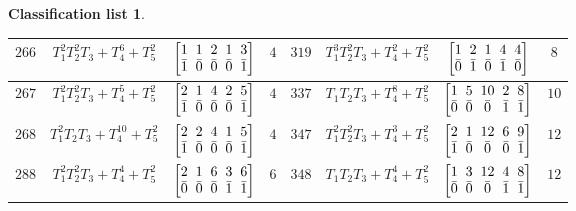 \documentclass[10pt,a4paper]{amsart}
\theoremstyle{definition}
\newtheorem{class-list}[thm]{Classification list}
\numberwithin{equation}{section}
\begin{document}
\begin{class-list}
\begin{table}[h!]
\begin{tabu}{c|c|c|c||c|c|c|c}
\\
\hline
${266}$&${T_{1}^{2}T_{2}^{2}T_{3}+T_{4}^{6}+T_{5}^{2}}$
&$\arraycolsep=1mm\begin{bmatrix}{1} & {1} & {2} & {1} & {3} \\ {\bar{1}} & {\bar{0}} & {\bar{0}} & {\bar{0}} & {\bar{1}}\end{bmatrix}$&${4}$
&${319}$&${T_{1}^{3}T_{2}^{2}T_{3}+T_{4}^{2}+T_{5}^{2}}$
&$\arraycolsep=1mm\begin{bmatrix}{1} & {2} & {1} & {4} & {4} \\ {\bar{0}} & {\bar{1}} & {\bar{0}} & {\bar{1}} & {\bar{0}}\end{bmatrix}$&${8}$
\\
\hline
${267}$&${T_{1}^{2}T_{2}^{2}T_{3}+T_{4}^{5}+T_{5}^{2}}$
&$\arraycolsep=1mm\begin{bmatrix}{2} & {1} & {4} & {2} & {5} \\ {\bar{1}} & {\bar{0}} & {\bar{0}} & {\bar{0}} & {\bar{1}}\end{bmatrix}$&${4}$
&${337}$&${T_{1}T_{2}T_{3}+T_{4}^{8}+T_{5}^{2}}$
&$\arraycolsep=1mm\begin{bmatrix}{1} & {5} & {10} & {2} & {8} \\ {\bar{0}} & {\bar{0}} & {\bar{0}} & {\bar{1}} & {\bar{1}}\end{bmatrix}$&${10}$
\\
\hline
${268}$&${T_{1}^{2}T_{2}T_{3}+T_{4}^{10}+T_{5}^{2}}$
&$\arraycolsep=1mm\begin{bmatrix}{2} & {2} & {4} & {1} & {5} \\ {\bar{1}} & {\bar{0}} & {\bar{0}} & {\bar{0}} & {\bar{1}}\end{bmatrix}$&${4}$
&${347}$&${T_{1}^{2}T_{2}^{2}T_{3}+T_{4}^{3}+T_{5}^{2}}$
&$\arraycolsep=1mm\begin{bmatrix}{2} & {1} & {12} & {6} & {9} \\ {\bar{1}} & {\bar{0}} & {\bar{0}} & {\bar{0}} & {\bar{1}}\end{bmatrix}$&${12}$
\\
\hline
${288}$&${T_{1}^{2}T_{2}^{2}T_{3}+T_{4}^{4}+T_{5}^{2}}$
&$\arraycolsep=1mm\begin{bmatrix}{2} & {1} & {6} & {3} & {6} \\ {\bar{0}} & {\bar{0}} & {\bar{0}} & {\bar{1}} & {\bar{1}}\end{bmatrix}$&${6}$
&${348}$&${T_{1}T_{2}T_{3}+T_{4}^{4}+T_{5}^{2}}$
&$\arraycolsep=1mm\begin{bmatrix}{1} & {3} & {12} & {4} & {8} \\ {\bar{0}} & {\bar{0}} & {\bar{0}} & {\bar{1}} & {\bar{1}}\end{bmatrix}$&${12}$

\end{tabu}
\end{table}
\end{class-list}
\end{document}
